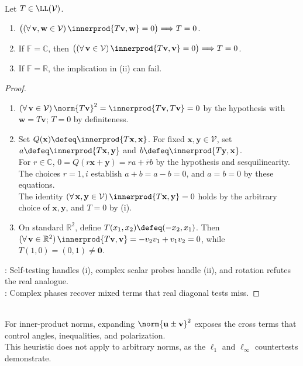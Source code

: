 \begin{proposition} \label{prop:operator-zero-tests-inner-products} \\
Let $T\in\LL(\mathcal{V})$.
\begin{enumerate}[label=(\roman*)]
\setlength{\itemsep}{0pt}
\item $\bigl((\forall\,\mathbf{v},\mathbf{w}\in\mathcal{V})\,\innerprod{T\mathbf{v},\mathbf{w}}=0\bigr)\Longrightarrow T=0$.
\item If $\mathbb{F}=\mathbb{C}$, then $\bigl((\forall\,\mathbf{v}\in\mathcal{V})\,\innerprod{T\mathbf{v},\mathbf{v}}=0\bigr)\Longrightarrow T=0$.
\item If $\mathbb{F}=\mathbb{R}$, the implication in (ii) can fail.
\end{enumerate}
\begin{proof}
\begin{enumerate}[label=(\roman*)]
\setlength{\itemsep}{0pt}
\item $(\forall\,\mathbf{v}\in\mathcal{V})\,\norm{T\mathbf{v}}^2=\innerprod{T\mathbf{v},T\mathbf{v}}=0$ by the hypothesis with $\mathbf{w}=T\mathbf{v}$; $T=0$ by definiteness.
\item Set $Q(\mathbf{x})\defeq\innerprod{T\mathbf{x},\mathbf{x}}$. For fixed $\mathbf{x},\mathbf{y}\in\mathcal{V}$, set $a\defeq\innerprod{T\mathbf{x},\mathbf{y}}$ and $b\defeq\innerprod{T\mathbf{y},\mathbf{x}}$.\\
For $r\in\mathbb{C}$, $0=Q(r\mathbf{x}+\mathbf{y})=ra+\overline{r}b$ by the hypothesis and sesquilinearity.\\
The choices $r=1,i$ establish $a+b=a-b=0$, and $a=b=0$ by these equations.\\
The identity $(\forall\,\mathbf{x},\mathbf{y}\in\mathcal{V})\,\innerprod{T\mathbf{x},\mathbf{y}}=0$ holds by the arbitrary choice of $\mathbf{x},\mathbf{y}$, and $T=0$ by (i).
\item On standard $\mathbb{R}^2$, define $T(x_1,x_2)\defeq(-x_2,x_1)$. Then $(\forall\,\mathbf{v}\in\mathbb{R}^2)\,\innerprod{T\mathbf{v},\mathbf{v}}=-v_2v_1+v_1v_2=0$, while $T(1,0)=(0,1)\neq\mathbf{0}$.
\end{enumerate}
: Self-testing handles (i), complex scalar probes handle (ii), and rotation refutes the real analogue.\\
: Complex phases recover mixed terms that real diagonal tests miss.
\end{proof}
\end{proposition}

\begin{principle} \label{pri:inner-product-geometry} \\
For inner-product norms, expanding $\norm{\mathbf{u}\pm\mathbf{v}}^2$ exposes the cross terms that control angles, inequalities, and polarization.\\
This heuristic does not apply to arbitrary norms, as the $\ell_1$ and $\ell_\infty$ countertests demonstrate.
\end{principle}
